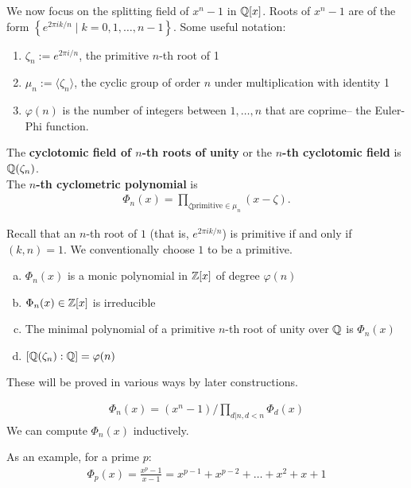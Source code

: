 \documentclass{memoir}
\begin{document}


We now focus on the splitting field of \(x^{n}-1\) in \(\mathbb{Q}[x]\). Roots of \(x^{n}-1\) are of the form \(\left\{e^{2\pi i k / n} \mid k = 0,1,\ldots,n-1 \right\} \). Some useful notation:
\begin{enumerate}
	\item \(\zeta _n := e^{2\pi i / n}\), the primitive \(n\)-th root of 1
	\item \(\mu_n := \langle \zeta _n \rangle \), the cyclic group of order \(n\) under multiplication with identity 1
	\item \(\varphi (n)\) is the number of integers between \(1,\ldots,n\) that are coprime-- the Euler-Phi function.
\end{enumerate}

\begin{defn}
	The \textbf{cyclotomic field of \(n\)-th roots of unity} or the \textbf{\(n\)-th cyclotomic field} is \(\mathbb{Q}(\zeta_n)\).\\

	The \textbf{\(n\)-th cyclometric polynomial} is
	\begin{align*}
		\Phi_n(x) = \prod_{\zeta \text{primitive} \in \mu_n} (x-\zeta ). 
	\end{align*}
\end{defn}
Recall that an \(n\)-th root of \(1\) (that is, \(e^{2\pi ik / n}\)) is primitive if and only if \((k,n) = 1\). We conventionally choose \(1\) to be a primitive.

\begin{thm}
	\begin{enumerate}[(a).]
		\item \(\Phi_n(x)\) is a monic polynomial in \(\mathbb{Z}[x]\) of degree \(\varphi (n)\) 
		\item \(\Phi_n(x) \in \mathbb{Z}[x]\) is irreducible
		\item The minimal polynomial of a primitive \(n\)-th root of unity over \(\mathbb{Q}\) is \(\Phi_n(x)\) 
		\item \([\mathbb{Q}(\zeta_n):\mathbb{Q}] = \varphi(n)\)
	\end{enumerate}
\end{thm}

These will be proved in various ways by later constructions.

\begin{cor}
	\begin{align*}
		\Phi_n(x) = (x^{n}-1) \big/ \prod_{d|n, d<n} \Phi_d(x) 
	\end{align*}
	We can compute \(\Phi_n(x)\) inductively.
\end{cor}
As an example, for a prime \(p\):
\begin{align*}
	\Phi_p(x) = \frac{x^{p}-1}{x-1} = x^{p-1}+ x^{p-2} + \ldots + x^2 + x + 1
\end{align*}
\end{document}
